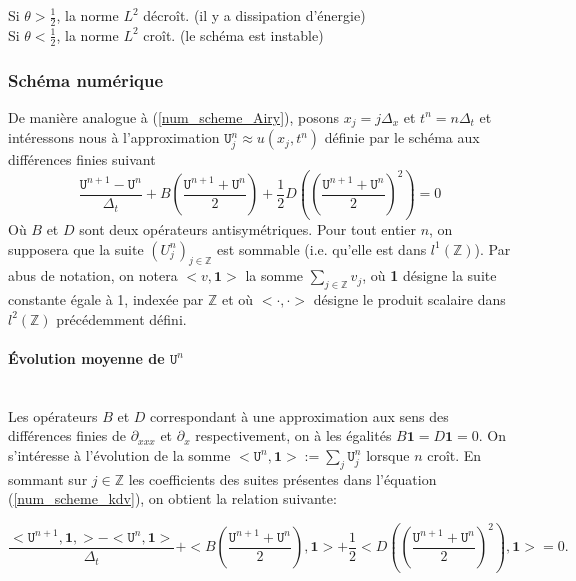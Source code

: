 \documentclass[12pt,a4paper]{article}
\numberwithin{equation}{section}
\begin{document}
Si $\theta > \frac{1}{2}$, la norme $L^2$ décroît. (il y a dissipation d'énergie)\\

Si $\theta < \frac{1}{2}$, la norme $L^2$ croît. (le schéma est instable)\\




\subsubsection{Schéma numérique}



De manière analogue à (\ref{num_scheme_Airy}), posons $x_j = j\Delta_x$ et $t^n = n\Delta_t$  et intéressons nous à l'approximation $\texttt{U}^n_j \approx u(x_j,t^n)$ définie par le schéma aux différences finies suivant
\begin{equation}
\frac{\texttt{U}^{n+1}-\texttt{U}^n}{\Delta_t} + B\left(\frac{\texttt{U}^{n+1} + \texttt{U}^{n}}{2}\right) + \frac{1}{2}D\left( \left(\frac{\texttt{U}^{n+1} + \texttt{U}^{n}}{2}\right)^2 \right) = 0 \label{num_scheme_kdv}
\end{equation}
Où $B$ et $D$ sont deux opérateurs antisymétriques. Pour tout entier $n$, on supposera que la suite $(U^n_j)_{j\in\mathbb{Z}}$ est sommable (i.e. qu'elle est dans $l^1(\mathbb{Z})$). Par abus de notation, on notera $<v,\textbf{1}>$ la somme $\sum_{j\in\mathbb{Z}}v_j$, où \textbf{1} désigne la suite constante égale à 1, indexée par $\mathbb{Z}$ et où $<\cdot,\cdot>$ désigne le produit scalaire dans $l^2(\mathbb{Z})$ précédemment défini.

\paragraph{Évolution moyenne de $\texttt{U}^n$}\,\\

Les opérateurs $B$ et $D$ correspondant à une approximation aux sens des différences finies de $\partial_{xxx}$ et $\partial_x$ respectivement, on à les égalités $B\textbf{1} = D\textbf{1} = 0 $. On s'intéresse à l'évolution de la somme $<\texttt{U}^n,\textbf{1}> := \sum_j \texttt{U}_j^n$ lorsque $n$ croît. En sommant sur $j\in\mathbb{Z}$ les coefficients des suites présentes dans l'équation (\ref{num_scheme_kdv}), on obtient la relation suivante:

\begin{equation*}
    \frac{<\texttt{U}^{n+1},\textbf{1},>-<\texttt{U}^n,\textbf{1}>}{\Delta_t} + <B\left(\frac{\texttt{U}^{n+1} + \texttt{U}^{n}}{2}\right),\textbf{1}> + \frac{1}{2}<D\left( \left(\frac{\texttt{U}^{n+1} + \texttt{U}^{n}}{2}\right)^2 \right),\textbf{1}> = 0 .
\end{equation*}
\end{document}
